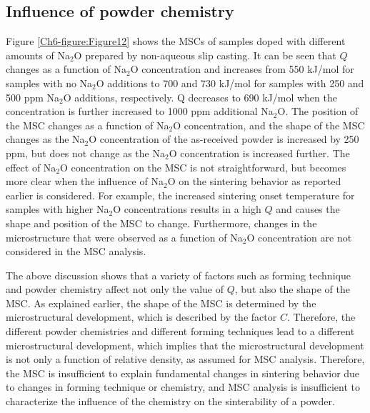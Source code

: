 \subsection{Influence of powder chemistry}
Figure \ref{Ch6-figure:Figure12} shows the MSCs of samples doped with different amounts of Na$_{2}$O prepared by non-aqueous slip casting. It can be seen that $Q$ changes as a function of Na$_{2}$O concentration and increases from 550 kJ/mol for samples with no Na$_{2}$O additions to 700 and 730 kJ/mol for samples with 250 and 500 ppm Na$_{2}$O additions, respectively. Q decreases to 690 kJ/mol when the concentration is further increased to 1000 ppm additional Na$_{2}$O. The position of the MSC changes as a function of Na$_{2}$O concentration, and the shape of the MSC changes as the Na$_{2}$O concentration of the as-received powder is increased by 250 ppm, but does not change as the Na$_{2}$O concentration is increased further. The effect of Na$_{2}$O concentration on the MSC is not straightforward, but becomes more clear when the influence of Na$_{2}$O on the sintering behavior as reported earlier is considered. For example, the increased sintering onset temperature for samples with higher Na$_{2}$O concentrations results in a high $Q$ and causes the shape and position of the MSC to change. Furthermore, changes in the microstructure that were observed as a function of Na$_{2}$O concentration are not considered in the MSC analysis. 

The above discussion shows that a variety of factors such as forming technique and powder chemistry affect not only the value of $Q$, but also the shape of the MSC. As explained earlier, the shape of the MSC is determined by the microstructural development, which is described by the factor $C$. Therefore, the different powder chemistries and different forming techniques lead to a different microstructural development, which implies that the microstructural development is not only a function of relative density, as assumed for MSC analysis. Therefore, the MSC is insufficient to explain fundamental changes in sintering behavior due to changes in forming technique or chemistry, and MSC analysis is insufficient to characterize the influence of the chemistry on the sinterability of a powder. 

